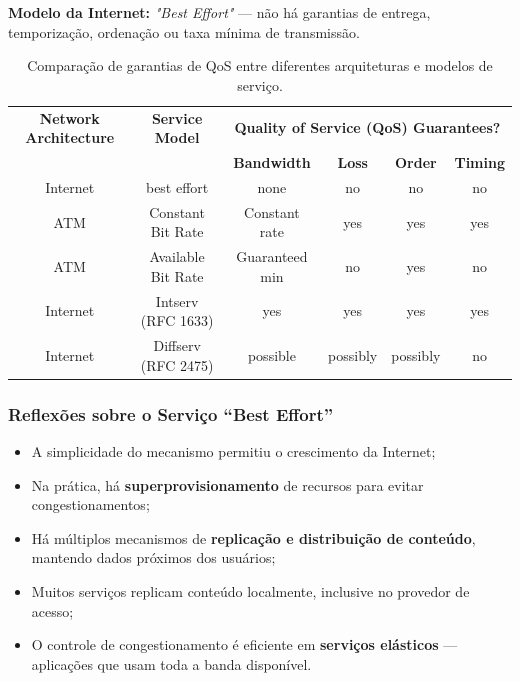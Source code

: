         \textbf{Modelo da Internet:} \textit{"Best Effort"} — não há garantias de entrega, temporização, ordenação ou taxa mínima de transmissão.

        \begin{table}[h!]
            \centering
            \renewcommand{\arraystretch}{1.3}
            \setlength{\tabcolsep}{3pt}
            \begin{tabular}{|c|c|cccc|}
                \hline
                \textbf{Network Architecture} & \textbf{Service Model} &
                \multicolumn{4}{c|}{\textbf{Quality of Service (QoS) Guarantees?}} \\ \cline{3-6}
                & & \textbf{Bandwidth} & \textbf{Loss} & \textbf{Order} & \textbf{Timing} \\ \hline
                Internet & best effort & none & no & no & no \\ \hline
                ATM & Constant Bit Rate & Constant rate & yes & yes & yes \\ \hline
                ATM & Available Bit Rate & Guaranteed min & no & yes & no \\ \hline
                Internet & Intserv (RFC 1633) & yes & yes & yes & yes \\ \hline
                Internet & Diffserv (RFC 2475) & possible & possibly & possibly & no \\ \hline
            \end{tabular}
            \caption{Comparação de garantias de QoS entre diferentes arquiteturas e modelos de serviço.}
        \end{table}

        \subsubsection*{Reflexões sobre o Serviço “Best Effort”}
            \begin{itemize}[left=0.5cm, align=left, nosep]
                \item A simplicidade do mecanismo permitiu o crescimento da Internet;
                \item Na prática, há \textbf{superprovisionamento} de recursos para evitar congestionamentos;
                \item Há múltiplos mecanismos de \textbf{replicação e distribuição de conteúdo}, mantendo dados próximos dos usuários;
                \item Muitos serviços replicam conteúdo localmente, inclusive no provedor de acesso;
                \item O controle de congestionamento é eficiente em \textbf{serviços elásticos} — aplicações que usam toda a banda disponível.
            \end{itemize}

